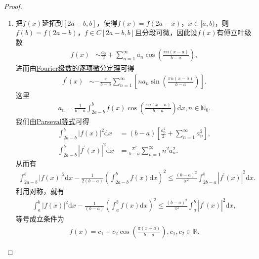 \documentclass[../../main.tex]{subfiles}
\begin{document}
\begin{proof}
\begin{enumerate}[(1)]
\item 把$f(x)$延拓到$[2a - b,b]$，使得$f(x)=f(2a - x)$，$x\in[a,b)$，则$f(b)=f(2a - b)$，$f\in C[2a - b,b]$且分段可微，因此设$f(x)$有傅立叶级数
\begin{align*}
f(x) &\sim \frac{a_0}{2}+\sum_{n = 1}^{\infty}a_n\cos\left(\frac{\pi n(x - a)}{b - a}\right),
\end{align*}
进而由\hyperref[theorem:Fourier级数的逐项微分定理]{Fourier级数的逐项微分定理}可得
\begin{align*}
f^{\prime}(x) &\sim -\frac{\pi}{b - a}\sum_{n = 1}^{\infty}[na_n\sin\left(\frac{\pi n(x - a)}{b - a}\right)].
\end{align*}
这里
\begin{align*}
a_n=\frac{1}{b - a}\int_{2a - b}^{b}f(x)\cos\left(\frac{\pi n(x - a)}{b - a}\right)\mathrm{d}x, n\in\mathbb{N}_0.
\end{align*}
我们由\hyperref[theorem:Parseval等式]{Parseval等式}可得
\begin{align*}
\int_{2a - b}^{b}|f(x)|^2\mathrm{d}x&=(b - a)\left[\frac{a_0^2}{2}+\sum_{n = 1}^{\infty}a_n^2\right],\\
\int_{2a - b}^{b}|f^{\prime}(x)|^2\mathrm{d}x&=\frac{\pi^2}{b - a}\sum_{n = 1}^{\infty}n^2a_n^2.
\end{align*}
从而有
\begin{align*}
\int_{2a - b}^{b}|f(x)|^2\mathrm{d}x-\frac{1}{2(b - a)}\left(\int_{2a - b}^{b}f(x)\mathrm{d}x\right)^2\leq\frac{(b - a)^2}{\pi^2}\int_{2b - a}^{b}|f^{\prime}(x)|^2\mathrm{d}x.
\end{align*}
利用对称，就有
\begin{align*}
\int_{a}^{b}|f(x)|^2\mathrm{d}x-\frac{1}{(b - a)}\left(\int_{a}^{b}f(x)\mathrm{d}x\right)^2\leq\frac{(b - a)^2}{\pi^2}\int_{a}^{b}|f^{\prime}(x)|^2\mathrm{d}x,
\end{align*}
等号成立条件为
\begin{align*}
f(x)=c_1 + c_2\cos\left(\frac{\pi(x - a)}{b - a}\right), c_1,c_2\in\mathbb{R}.
\end{align*}


\end{enumerate}
\end{proof}
\end{document}
